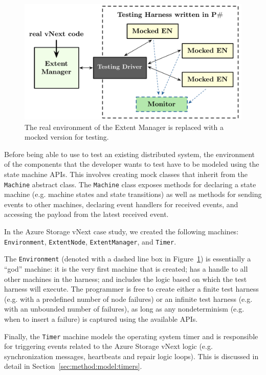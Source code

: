 \begin{figure}[t]
\centering
\includegraphics[width=\linewidth]{img/mocked_vnext}
\caption{The real environment of the Extent Manager is replaced with a mocked version for testing.}
\label{fig:azurestoremodel}
\end{figure}

Before being able to use \psharp to test an existing distributed system, the environment of the components that the developer wants to test have to be modeled using the \psharp state machine APIs.  This involves creating mock classes that inherit from the \texttt{Machine} abstract class. The \texttt{Machine} class exposes methods for declaring a state machine (e.g. machine states and state transitions) as well as methods for sending events to other machines, declaring event handlers for received events, and accessing the payload from the latest received event.

In the Azure Storage vNext case study, we created the following \psharp machines: \texttt{Environment}, \texttt{ExtentNode}, \texttt{ExtentManager}, and \texttt{Timer}.

The \texttt{Environment} (denoted with a dashed line box in Figure~\ref{fig:azurestoremodel}) is essentially a ``god'' machine: it is the very first machine that is created; has a handle to all other machines in the harness; and includes the logic based on which the test harness will execute. The programmer is free to create either a finite test harness (e.g. with a predefined number of node failures) or an infinite test harness (e.g. with an unbounded number of failures), as long as any nondeterminism (e.g. when to insert a failure) is captured using the available \psharp APIs.

Finally, the \texttt{Timer} machine models the operating system timer and is responsible for triggering events related to the Azure Storage vNext logic (e.g. synchronization messages, heartbeats and repair logic loops). This is discussed in detail in Section~\ref{sec:method:model:timers}.

